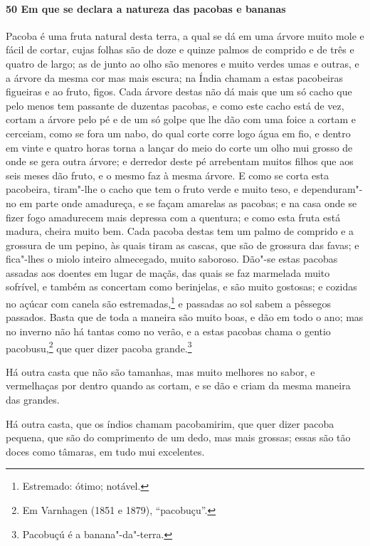 \paragraph{50 Em que se declara a natureza das pacobas e bananas}

\mbox{Pacoba} é uma fruta natural desta terra, a qual se dá em uma árvore muito mole e fácil de
cortar, cujas folhas são de doze e quinze palmos de comprido e de três e quatro de largo;
as de junto ao olho são menores e muito verdes umas e outras, e a árvore da mesma cor mas
mais escura; na Índia chamam a estas pacobeiras figueiras e ao fruto, figos. Cada árvore
destas não dá mais que um só cacho que pelo menos tem passante de duzentas pacobas, e como
este cacho está de vez, cortam a árvore pelo pé e de um só golpe que lhe dão com uma foice
a cortam e cerceiam, como se fora um nabo, do qual corte corre logo água em fio, e dentro
em vinte e quatro horas torna a lançar do meio do corte um olho mui grosso de onde se gera
outra árvore; e derredor deste pé arrebentam muitos filhos que aos seis meses dão fruto, e
o mesmo faz à mesma árvore. E como se corta esta pacobeira, tiram"-lhe o cacho que tem o
fruto verde e muito teso, e dependuram"-no em parte onde amadureça, e se façam amarelas as
pacobas; e na casa onde se fizer fogo amadurecem mais depressa com a quentura; e como esta
fruta está madura, cheira muito bem. Cada pacoba destas tem um palmo de comprido e a
grossura de um pepino, às quais tiram as cascas, que são de grossura das favas; e
fica"-lhes o miolo inteiro almecegado, muito saboroso. Dão"-se estas pacobas assadas aos
doentes em lugar de maçãs, das quais se faz marmelada muito sofrível, e também as
concertam como berinjelas, e são muito gostosas; e cozidas no açúcar com canela são
estremadas,\footnote{ Estremado: ótimo; notável.} e passadas ao sol sabem a pêssegos
passados. Basta que de toda a maneira são muito boas, e dão em todo o ano; mas no inverno
não há tantas como no verão, e a estas pacobas chama o gentio pacobusu,\footnote{ Em
Varnhagen (1851 e 1879), ``pacobuçu''.} que quer dizer pacoba grande.\footnote{ Pacobuçú é
a banana"-da"-terra.}

Há outra casta que não são tamanhas, mas muito melhores no sabor, e vermelhaças por dentro
quando as cortam, e se dão e criam da mesma maneira das grandes.

Há outra casta, que os índios chamam pacobamirim, que quer dizer pacoba pequena, que são
do comprimento de um dedo, mas mais grossas; essas são tão doces como tâmaras, em tudo mui
excelentes.

